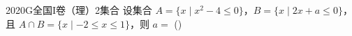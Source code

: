 
\begin{problem}{2020}{G}{全国I卷（理）}{2}{集合}
设集合 $ A = \{x \mid x^2 - 4 \leqslant 0\} $，$ B = \{x \mid 2x + a \leqslant 0\} $，且 $ A \cap B = \{x \mid -2 \leqslant x \leqslant 1\} $，则 $ a = $ (\hspace{1cm})
\begin{choices}
\end{choices}
\end{problem}

\begin{answer}

\end{answer}

\begin{solutions}

\end{solutions}